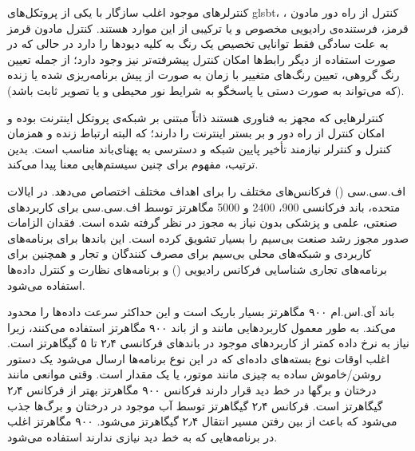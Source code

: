 
کنترلرهای موجود اغلب سازگار با یکی از پروتکل‌های
gls{bt}،
،
کنترل از راه دور مادون قرمز، فرستنده‌ی رادیویی مخصوص و یا ترکیبی از این موارد هستند. کنترل مادون قرمز به علت سادگی فقط توانایی تخصیص یک رنگ به کلیه دیودها را دارد در حالی که در صورت استفاده از دیگر رابط‌ها امکان کنترل پیشرفته‌تر نیز وجود دارد؛ از جمله تعیین رنگ گروهی، تعیین رنگ‌های متغییر با زمان به صورت از پیش برنامه‌ریزی شده یا زنده (که می‌تواند به صورت دستی یا پاسخگو به شرایط نور محیطی و یا تصویر ثابت باشد).

کنترلرهایی که مجهز به فناوری  هستند ذاتاً مبتنی بر شبکه‌ی پروتکل اینترنت بوده و امکان کنترل از راه دور و بر بستر اینترنت را دارند؛ که البته ارتباط زنده و همزمان کنترل و کنترلر نیازمند تأخیر پایین شبکه و دسترسی به پهنای‌باند مناسب است. بدین ترتیب، مفهوم  برای چنین سیستم‌هایی معنا پیدا می‌کند.


اف.سی.سی () فرکانس‌های مختلف را برای اهداف مختلف اختصاص می‌دهد. در ایالات متحده، باند فرکانسی 900، 2400 و 5000 مگاهرتز توسط اف.سی.سی برای کاربردهای صنعتی، علمی و پزشکی بدون نیاز به مجوز در نظر گرفته شده است. فقدان الزامات صدور مجوز رشد صنعت بی‌سیم را بسیار تشویق کرده است. این باندها برای برنامه‌های کاربردی  و شبکه‌های محلی بی‌سیم برای مصرف کنندگان و تجار و همچنین برای برنامه‌های تجاری شناسایی فرکانس رادیویی () و برنامه‌های نظارت و کنترل داده‌ها استفاده می‌شود.

باند آی.اس.ام ۹۰۰ مگاهرتز بسیار باریک است و این حداکثر سرعت داده‌ها را محدود می‌کند. به طور معمول کاربردهایی مانند  و  از باند ۹۰۰ مگاهرتز استفاده می‌کنند، زیرا نیاز به نرخ داده کمتر از کاربردهای موجود در باندهای فرکانسی ۲٫۴ تا ۵ گیگاهرتز است. اغلب اوقات نوع بسته‌های داده‌ای که در این نوع برنامه‌ها ارسال می‌شود یک دستور روشن/خاموش ساده به چیزی مانند موتور، یا یک مقدار است. وقتی موانعی مانند درختان و برگها در خط دید قرار دارند فرکانس ۹۰۰ مگاهرتز بهتر از فرکانس ۲٫۴ گیگاهرتز است. فرکانس ۲٫۴ گیگاهرتز توسط آب موجود در درختان و برگ‌ها جذب می‌شود که باعث از بین رفتن مسیر انتقال ۲٫۴ گیگاهرتز می‌شود. ۹۰۰ مگاهرتز اغلب در برنامه‌هایی که به خط دید نیازی ندارند استفاده می‌شود.

